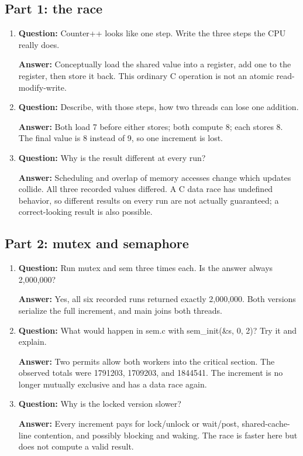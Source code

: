 \documentclass[12pt]{article}
\begin{document}
\subsection{Part 1: the race}
\begin{enumerate}
\item \textbf{Question:} Counter++ looks like one step. Write the three steps the CPU really does.
\par\textbf{Answer:} Conceptually load the shared value into a register,
add one to the register, then store it back. This ordinary C operation is
not an atomic read-modify-write.

\item \textbf{Question:} Describe, with those steps, how two threads can lose one addition.
\par\textbf{Answer:} Both load 7 before either stores; both compute 8;
each stores 8. The final value is 8 instead of 9, so one increment is lost.

\item \textbf{Question:} Why is the result different at every run?
\par\textbf{Answer:} Scheduling and overlap of memory accesses change
which updates collide. All three recorded values differed. A C data race
has undefined behavior, so different results on every run are not actually
guaranteed; a correct-looking result is also possible.
\end{enumerate}

\subsection{Part 2: mutex and semaphore}
\begin{enumerate}
\item \textbf{Question:} Run mutex and sem three times each. Is the answer always 2,000,000?
\par\textbf{Answer:} Yes, all six recorded runs returned exactly 2,000,000.
Both versions serialize the full increment, and main joins both threads.

\item \textbf{Question:} What would happen in sem.c with sem\_init(\&s, 0, 2)? Try it and explain.
\par\textbf{Answer:} Two permits allow both workers into the critical
section. The observed totals were 1791203, 1709203, and 1844541. The
increment is no longer mutually exclusive and has a data race again.

\item \textbf{Question:} Why is the locked version slower?
\par\textbf{Answer:} Every increment pays for lock/unlock or wait/post,
shared-cache-line contention, and possibly blocking and waking. The race
is faster here but does not compute a valid result.
\end{enumerate}
\end{document}
